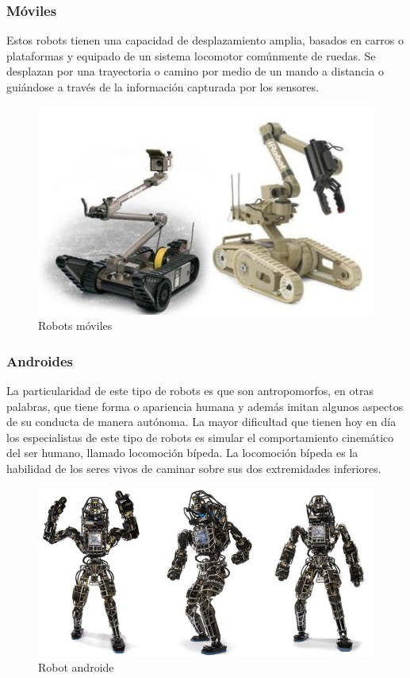         \subsubsection{Móviles}
        Estos robots tienen una capacidad de desplazamiento amplia, basados en carros o plataformas y equipado de un sistema locomotor comúnmente de ruedas. Se desplazan por una trayectoria o camino por medio de un mando a distancia o guiándose a través de la información capturada por los sensores.
        
        \begin{figure}[htb]
            \centering
            \includegraphics[width=0.4\linewidth]{Main/Chapter2/Images2/Robots-moviles.jpg}
            \caption{Robots móviles}
            \label{f:Cap2_general_8}
        \end{figure}
        
        \subsubsection{Androides}
        La particularidad de este tipo de robots es que son antropomorfos, en otras palabras, que tiene forma o apariencia humana y además imitan algunos aspectos de su conducta de manera autónoma. La mayor dificultad que tienen hoy en día los especialistas de este tipo de robots es simular el comportamiento cinemático del ser humano, llamado locomoción bípeda. La locomoción bípeda es la habilidad de los seres vivos de caminar sobre sus dos extremidades inferiores.
        
        \begin{figure}[htb]
            \centering
            \includegraphics[width=0.6\linewidth]{Main/Chapter2/Images2/Robot-androide.png}
            \caption{Robot androide}
            \label{f:Cap2_general_9}
        \end{figure}
        
